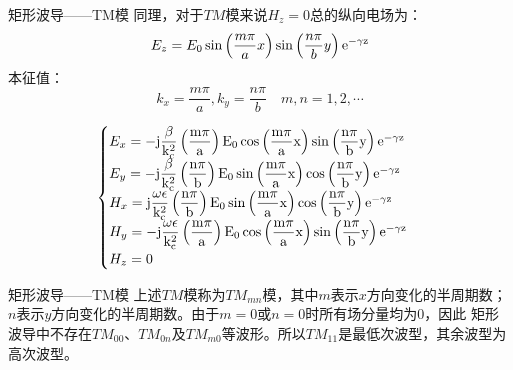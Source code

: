 \begin{frame}{矩形波导——TM模}
    同理，对于$TM$模来说$H_z=0$总的纵向电场为：
    \begin{align}
        E_z=E_0\sin\left(\frac{m\pi}{a}x\right)\sin\left(\frac{n\pi}{b}y\right)\rm{e}^{-\gamma z}
    \end{align}
    本征值：
    $$k_x=\frac{m\pi}{a},k_y=\frac{n\pi}{b}\quad m,n=1,2,\cdots$$

    \begin{align*}
        \begin{cases}
            E_x = -\rm{j}\dfrac{\beta}{k_c^2}\left(\dfrac{m\pi}{a}\right)E_0\cos\left(\dfrac{m\pi}{a}x\right)\sin\left(\dfrac{n\pi}{b}y\right)\rm{e}^{-\gamma z}          \\
            E_y = -\rm{j}\dfrac{\beta}{k_c^2}\left(\dfrac{n\pi}{b}\right)E_0\sin\left(\dfrac{m\pi}{a}x\right)\cos\left(\dfrac{n\pi}{b}y\right)\rm{e}^{-\gamma z}          \\
            H_x = \rm{j}\dfrac{\omega\epsilon}{k_c^2}\left(\dfrac{n\pi}{b}\right)E_0\sin\left(\dfrac{m\pi}{a}x\right)\cos\left(\dfrac{n\pi}{b}y\right)\rm{e}^{-\gamma z}  \\
            H_y = -\rm{j}\dfrac{\omega\epsilon}{k_c^2}\left(\dfrac{m\pi}{a}\right)E_0\cos\left(\dfrac{m\pi}{a}x\right)\sin\left(\dfrac{n\pi}{b}y\right)\rm{e}^{-\gamma z} \\
            H_z = 0
        \end{cases}
    \end{align*}
\end{frame}

\begin{frame}{矩形波导——TM模}
    上述$TM$模称为$TM_{mn}$模，其中$m$表示$x$方向变化的半周期数；$n$表示$y$方向变化的半周期数。由于$m=0$或$n=0$时所有场分量均为0，因此
    矩形波导中不存在$TM_{00}$、$TM_{0n}$及$TM_{m0}$等波形。所以$TM_{11}$是最低次波型，其余波型为高次波型。\\
\end{frame}

